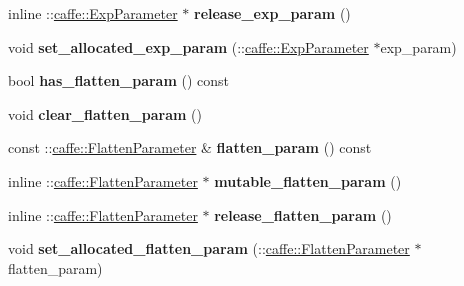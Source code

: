 \begin{DoxyCompactItemize}
\item 
\mbox{\label{classcaffe_1_1_layer_parameter_a563d5c81e53027a5bde53e0e221c5895}} 
inline \+::\mbox{\hyperlink{classcaffe_1_1_exp_parameter}{caffe\+::\+Exp\+Parameter}} $\ast$ {\bfseries release\+\_\+exp\+\_\+param} ()
\item 
\mbox{\label{classcaffe_1_1_layer_parameter_aa131affe58f3c3f4c7889847909644a4}} 
void {\bfseries set\+\_\+allocated\+\_\+exp\+\_\+param} (\+::\mbox{\hyperlink{classcaffe_1_1_exp_parameter}{caffe\+::\+Exp\+Parameter}} $\ast$exp\+\_\+param)
\item 
\mbox{\label{classcaffe_1_1_layer_parameter_a93753064eb6bf7cd7c2ed4b103b5823d}} 
bool {\bfseries has\+\_\+flatten\+\_\+param} () const
\item 
\mbox{\label{classcaffe_1_1_layer_parameter_a75968191aaa1049b2429463460eddb6b}} 
void {\bfseries clear\+\_\+flatten\+\_\+param} ()
\item 
\mbox{\label{classcaffe_1_1_layer_parameter_a1d6fb76023d6bd8edbc541c24d13366b}} 
const \+::\mbox{\hyperlink{classcaffe_1_1_flatten_parameter}{caffe\+::\+Flatten\+Parameter}} \& {\bfseries flatten\+\_\+param} () const
\item 
\mbox{\label{classcaffe_1_1_layer_parameter_abc127800117b2bf079fcf2c02a414b07}} 
inline \+::\mbox{\hyperlink{classcaffe_1_1_flatten_parameter}{caffe\+::\+Flatten\+Parameter}} $\ast$ {\bfseries mutable\+\_\+flatten\+\_\+param} ()
\item 
\mbox{\label{classcaffe_1_1_layer_parameter_ad457470261099a61355fbc7231b9734a}} 
inline \+::\mbox{\hyperlink{classcaffe_1_1_flatten_parameter}{caffe\+::\+Flatten\+Parameter}} $\ast$ {\bfseries release\+\_\+flatten\+\_\+param} ()
\item 
\mbox{\label{classcaffe_1_1_layer_parameter_a52bf0f18889032e918d0a2a8eff71a2e}} 
void {\bfseries set\+\_\+allocated\+\_\+flatten\+\_\+param} (\+::\mbox{\hyperlink{classcaffe_1_1_flatten_parameter}{caffe\+::\+Flatten\+Parameter}} $\ast$flatten\+\_\+param)

\end{DoxyCompactItemize}
